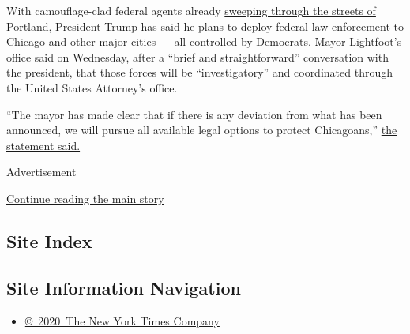 With camouflage-clad federal agents already
\href{https://www.nytimes3xbfgragh.onion/2020/07/18/us/portland-protests.html}{sweeping
through the streets of Portland}, President Trump has said he plans to
deploy federal law enforcement to Chicago and other major cities --- all
controlled by Democrats. Mayor Lightfoot's office said on Wednesday,
after a ``brief and straightforward'' conversation with the president,
that those forces will be ``investigatory'' and coordinated through the
United States Attorney's office.

``The mayor has made clear that if there is any deviation from what has
been announced, we will pursue all available legal options to protect
Chicagoans,''
\href{https://www.chicago.gov/city/en/depts/mayor/press_room/press_releases/2020/july/StatementPresidentTrump.html}{the
statement said.}

Advertisement

\protect\hyperlink{after-bottom}{Continue reading the main story}

\hypertarget{site-index}{%
\subsection{Site Index}\label{site-index}}

\hypertarget{site-information-navigation}{%
\subsection{Site Information
Navigation}\label{site-information-navigation}}

\begin{itemize}
\tightlist
\item
  \href{https://help.nytimes3xbfgragh.onion/hc/en-us/articles/115014792127-Copyright-notice}{©~2020~The
  New York Times Company}
\end{itemize}


